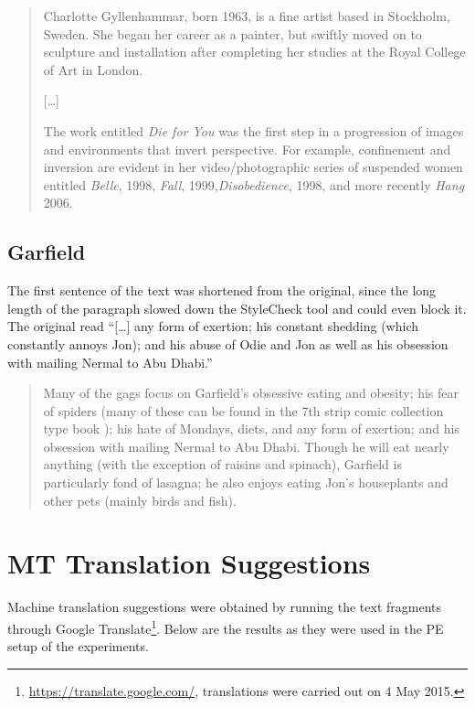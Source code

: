 \begin{quotation}
\noindent Charlotte Gyllenhammar, born 1963, is a fine artist based in Stockholm, Sweden. She began her career as a painter, but swiftly moved on to sculpture and installation after completing her studies at the Royal College of Art in London. 

[\dots] 

The work entitled \textit{Die for You} was the first step in a progression of images and environments that invert perspective. For example, confinement and inversion are evident in her video/photographic series of suspended women entitled \textit{Belle}, 1998, \textit{Fall}, 1999,\textit{Disobedience}, 1998, and more recently \textit{Hang} 2006.
\flushright\parencite{wikicharlotte}
\end{quotation}

\subsection{Garfield}

\noindent The first sentence of the text was shortened from the original, since the long length of the paragraph slowed down the StyleCheck tool and could even block it. The original read ``[\dots] any form of exertion; his constant shedding (which constantly annoys Jon); and his abuse of Odie and Jon as well as his obsession with mailing Nermal to Abu Dhabi.''


\begin{quotation}
\noindent Many of the gags focus on Garfield's obsessive eating and obesity; his fear of spiders (many of these can be found in the 7th strip comic collection type book ); his hate of Mondays, diets, and any form of exertion; and his obsession with mailing Nermal to Abu Dhabi.  Though he will eat nearly anything (with the exception of raisins and spinach), Garfield is particularly fond of lasagna; he also enjoys eating Jon's houseplants and other pets (mainly birds and fish).
\flushright\parencite{wikigarfield}
\end{quotation}

\section{MT Translation Suggestions}

\noindent Machine translation suggestions were obtained by running the text fragments through Google Translate\footnote{\url{https://translate.google.com/}, translations were carried out on 4 May 2015.}. Below are the results as they were used in the \ac{PE} setup of the experiments.

